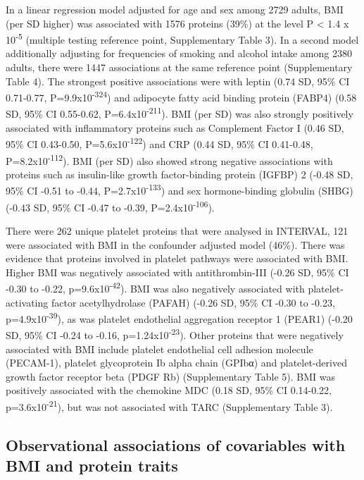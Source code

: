 \documentclass[11pt,twoside]{bristolthesis}
\begin{document}
In a linear regression model adjusted for age and sex among 2729 adults, BMI (per SD higher) was associated with 1576 proteins (39\%) at the level P \textless{} 1.4 x 10\textsuperscript{-5} (multiple testing reference point, Supplementary Table 3). In a second model additionally adjusting for frequencies of smoking and alcohol intake among 2380 adults, there were 1447 associations at the same reference point (Supplementary Table 4). The strongest positive associations were with leptin (0.74 SD, 95\% CI 0.71-0.77, P=9.9x10\textsuperscript{-324}) and adipocyte fatty acid binding protein (FABP4) (0.58 SD, 95\% CI 0.55-0.62, P=6.4x10\textsuperscript{-211}). BMI (per SD) was also strongly positively associated with inflammatory proteins such as Complement Factor I (0.46 SD, 95\% CI 0.43-0.50, P=5.6x10\textsuperscript{-122}) and CRP (0.44 SD, 95\% CI 0.41-0.48, P=8.2x10\textsuperscript{-112}). BMI (per SD) also showed strong negative associations with proteins such as insulin-like growth factor-binding protein (IGFBP) 2 (-0.48 SD, 95\% CI -0.51 to -0.44, P=2.7x10\textsuperscript{-133}) and sex hormone-binding globulin (SHBG) (-0.43 SD, 95\% CI -0.47 to -0.39, P=2.4x10\textsuperscript{-106}).

There were 262 unique platelet proteins that were analysed in INTERVAL, 121 were associated with BMI in the confounder adjusted model (46\%). There was evidence that proteins involved in platelet pathways were associated with BMI. Higher BMI was negatively associated with antithrombin-III (-0.26 SD, 95\% CI -0.30 to -0.22, p=9.6x10\textsuperscript{-42}). BMI was also negatively associated with platelet-activating factor acetylhydrolase (PAFAH) (-0.26 SD, 95\% CI -0.30 to -0.23, p=4.9x10\textsuperscript{-39}), as was platelet endothelial aggregation receptor 1 (PEAR1) (-0.20 SD, 95\% CI -0.24 to -0.16, p=1.24x10\textsuperscript{-23}). Other proteins that were negatively associated with BMI include platelet endothelial cell adhesion molecule (PECAM-1), platelet glycoprotein Ib alpha chain (GPIbα) and platelet-derived growth factor receptor beta (PDGF Rb) (Supplementary Table 5). BMI was positively associated with the chemokine MDC (0.18 SD, 95\% CI 0.14-0.22, p=3.6x10\textsuperscript{-21}), but was not associated with TARC (Supplementary Table 3).

\hypertarget{observational-associations-of-covariables-with-bmi-and-protein-traits}{%
\subsection{Observational associations of covariables with BMI and protein traits}\label{observational-associations-of-covariables-with-bmi-and-protein-traits}}
\end{document}
